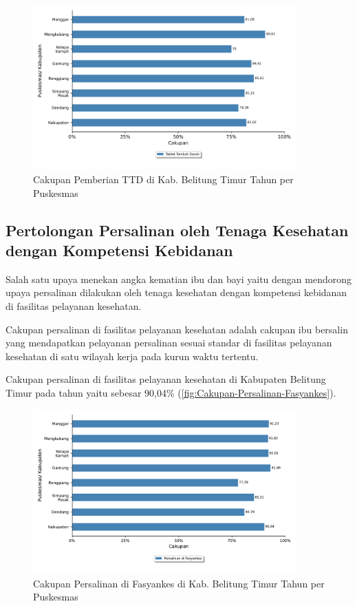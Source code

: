 \begin{figure}[H]
    \centering
    \includegraphics[width=0.9\textwidth]{bab_05/bab_05_05_TTD}
    \caption{Cakupan Pemberian TTD di Kab. Belitung Timur Tahun \tP per Puskesmas}
    \label{fig:Cakupan-TTD}
\end{figure}


\subsection{Pertolongan Persalinan oleh Tenaga Kesehatan dengan Kompetensi Kebidanan}
Salah satu upaya menekan angka kematian ibu dan bayi yaitu dengan mendorong upaya persalinan dilakukan oleh tenaga kesehatan dengan kompetensi kebidanan di fasilitas pelayanan kesehatan.

Cakupan persalinan di fasilitas pelayanan kesehatan adalah cakupan ibu bersalin yang mendapatkan pelayanan persalinan sesuai standar di fasilitas pelayanan kesehatan di satu wilayah kerja pada kurun waktu tertentu.

Cakupan persalinan di fasilitas pelayanan kesehatan di Kabupaten Belitung Timur pada tahun \tP yaitu sebesar 90,04\% (\autoref{fig:Cakupan-Persalinan-Fasyankes}).

\begin{figure}[H]
    \centering
    \includegraphics[width=0.9\textwidth]{bab_05/bab_05_05b_salinFasyankes.pdf}
    \caption{Cakupan Persalinan di Fasyankes di Kab. Belitung Timur Tahun \tP per Puskesmas}
    \label{fig:Cakupan-Persalinan-Fasyankes}
\end{figure}

